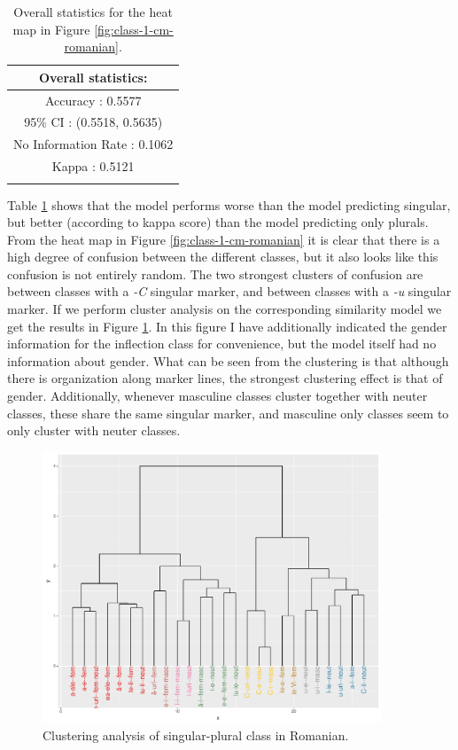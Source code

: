 \begin{table}[!htpb]
  \centering
  \begin{tabular}{c}
    \lsptoprule
    Overall statistics: \\
    \midrule
    Accuracy : 0.5577\\
    95\% CI : (0.5518, 0.5635)\\
    No Information Rate : 0.1062\\
    Kappa : 0.5121\\
    \lspbottomrule
  \end{tabular}
  \caption{Overall statistics for the heat map in Figure \ref{fig:class-1-cm-romanian}.}\label{tab:class-1-romanian-stats}
\end{table}

Table \ref{tab:class-1-romanian-stats} shows that the model performs worse than the model predicting singular, but better (according to kappa score) than the model predicting only plurals. From the heat map in Figure \ref{fig:class-1-cm-romanian} it is clear that there is a high degree of confusion between the different classes, but it also looks like this confusion is not entirely random. The two strongest clusters of confusion are between classes with a \textit{-C} singular marker, and between classes with a \textit{-u} singular marker. If we perform cluster analysis on the corresponding similarity model we get the results in Figure \ref{fig:romanian-clust-class-1}. In this figure I have additionally indicated the gender information for the inflection class for convenience, but the model itself had no information about gender. What can be seen from the clustering is that although there is organization along marker lines, the strongest clustering effect is that of gender. Additionally, whenever masculine classes cluster together with neuter classes, these share the same singular marker, and masculine only classes seem to only cluster with neuter classes.

\begin{figure}[!ptbh]
  \centering
  \includegraphics[width=0.9\textwidth]{./figures/romanian/romanian-clust-class-1.pdf}
  \caption{Clustering analysis of singular-plural class in Romanian.}\label{fig:romanian-clust-class-1}
\end{figure}

